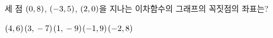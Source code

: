 \hspace*{2mm}\begin{minipage}[t]{\dimexpr\linewidth-2mm\relax}\vspace{0pt}
세 점 $(0{,}\mkern3mu 8)$, $(-3{,}\mkern3mu 5)$, $(2{,}\mkern3mu 0)$을 지나는 이차함수의 그래프의 꼭짓점의 좌표는?
\begin{choices32}{$(4{,}\mkern3mu 6)$}{$(3{,}\mkern3mu -7)$}{$(1{,}\mkern3mu -9)$}{$(-1{,}\mkern3mu 9)$}{$(-2{,}\mkern3mu 8)$}\end{choices32}\end{minipage}

